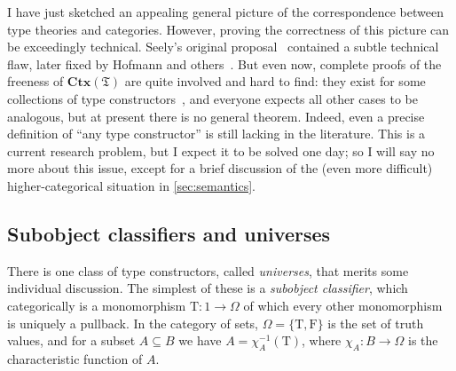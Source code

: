 \documentclass[12pt]{article}
\def\true{\mathrm{T}}
\def\false{\mathrm{F}}
\def\fT{\mathfrak{T}}
\def\CtxT{\mathbf{Ctx}(\fT)}
\numberwithin{equation}{section}
\begin{document}
I have just sketched an appealing general picture of the correspondence between type theories and categories.
However, proving the correctness of this picture can be exceedingly technical.
Seely's original proposal~\cite{seely:lccc-tt} contained a subtle technical flaw, later fixed by Hofmann and others~\cite{curien:subst,hofmann:ttinlccc,hofmann:ssdts,cd:lccc-tt}. %
But even now, complete proofs of the freeness of $\CtxT$ are quite involved and hard to find: they exist for some collections of type constructors~\cite{ls:hocl,jacobs:cltt,ptj:elephant,cd:lccc-tt,streicher:semtt}, and everyone expects all other cases to be analogous, but at present there is no general theorem. %
Indeed, even a precise definition of ``any type constructor'' is still lacking in the literature.
This is a current research problem, but I expect it to be solved one day; so I will say no more about this issue, except for a brief discussion of the (even more difficult) higher-categorical situation in \cref{sec:semantics}.



\subsection{Subobject classifiers and universes}
\label{sec:universes}

% 

There is one class of type constructors, called \emph{universes}, that merits some individual discussion.
The simplest of these is a \emph{subobject classifier}, which categorically is a monomorphism $\true:1\to \Omega$ of which every other monomorphism is uniquely a pullback. %
In the category of sets, $\Omega = \{\true,\false\}$ is the set of truth values, and for a subset $A\subseteq B$ we have $A = \chi_A^{-1}(\true)$, where $\chi_A:B\to \Omega$ is the characteristic function of $A$.
\end{document}
